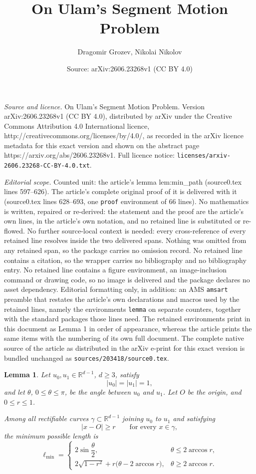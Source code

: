 \documentclass[10pt,a4paper]{amsart}
\title{On Ulam's Segment Motion Problem}
\author{Dragomir Grozev, Nikolai Nikolov}
\date{Source: arXiv:2606.23268v1 (CC BY 4.0)}
\newtheorem{lemma}{Lemma}
\begin{document}
\maketitle

\noindent\emph{Source and licence.} On Ulam's Segment Motion Problem. Version arXiv:2606.23268v1 (CC BY 4.0), distributed by arXiv under the Creative Commons Attribution 4.0 International licence, http://creativecommons.org/licenses/by/4.0/, as recorded in the arXiv licence metadata for this exact version and shown on the abstract page https://arxiv.org/abs/2606.23268v1. Full licence notice: \texttt{licenses/arxiv-2606.23268-CC-BY-4.0.txt}.\par\smallskip

\noindent\textit{Editorial scope.} Counted unit: the article's lemma lem:min\_path (source0.tex lines 597--626). The article's complete original proof of it is delivered with it (source0.tex lines 628--693, one \texttt{proof} environment of 66 lines). No mathematics is written, repaired or re-derived: the statement and the proof are the article's own lines, in the article's own notation, and no retained line is substituted or re-flowed.  No further source-local context is needed: every cross-reference of every retained line resolves inside the two delivered spans.  Nothing was omitted from any retained span, so the package carries no omission record.  No retained line contains a citation, so the wrapper carries no bibliography and no bibliography entry.  No retained line contains a figure environment, an image-inclusion command or drawing code, so no image is delivered and the package declares no asset dependency.  Editorial formatting only, in addition: an AMS \texttt{amsart} preamble that restates the article's own declarations and macros used by the retained lines, namely the environments \texttt{lemma} on separate counters, together with the standard packages those lines need.  The retained environments print in this document as Lemma 1 in order of appearance, whereas the article prints the same items with the numbering of its own full document.  The complete native source of the article as distributed in the arXiv e-print for this exact version is bundled unchanged as \texttt{sources/203418/source0.tex}.
\begin{lemma}
\label{lem:min_path}
Let \(u_0,u_1\in\mathbb R^{d-1}\), $d\ge 3$, satisfy
\[
|u_0|=|u_1|=1,
\]
and let \(\theta\), \(0\le \theta\le \pi\), be the angle between \(u_0\) and \(u_1\).
Let \(O\) be the origin, and $0\le r\le 1$.

Among all rectifiable curves \(\gamma\subset\mathbb R^{d-1}\) joining \(u_0\) to \(u_1\)
and satisfying
\[
|x-O|\ge r
\qquad\text{for every }x\in\gamma,
\]
the minimum possible length is
\[
\ell_{\min}
=
\begin{cases}
2\sin\dfrac{\theta}{2},
&
\theta\le 2\arccos r,
\\[8pt]
2\sqrt{1-r^2}+r\bigl(\theta-2\arccos r\bigr),
&
\theta\ge 2\arccos r.
\end{cases}
\]
\end{lemma}
\end{document}
